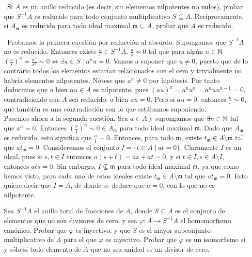 \documentclass[twoside]{article}
\begin{document}
\begin{ejercicio}{6}\
Si $A$ es un anillo reducido (es decir, sin elementos nilpotentes no
nulos), probar que $S^{-1}A$ es reducido para todo conjunto multiplicativo $S \subseteq A$.
Recíprocamente, si $A_\mathfrak{m}$ es reducido para todo ideal maximal $\mathfrak{m} \subseteq A$, probar que
$A$ es reducido.
\end{ejercicio}
\begin{solucion}\
Probamos la primera cuestión por reducción al absurdo. Supongamos que $S^{-1}A$ no es reducido. Entonces existe $\frac{a}{s}\in S^{-1}A$, $\frac{a}{s}\not\sim 0$ tal que para algún $n\in\mathbb{N}$ $\left(\frac{a}{s}\right)^n=\frac{a^n}{s^n}\sim 0\Leftrightarrow \exists u\in S\mid a^nu=0$. Vamos a suponer que $u\neq 0$, puesto que de lo contrario todos los elementos estarían relacionados con el cero y trivialmente no habría elementos nilpotentes.  Nótese que $a^n\neq 0$ por hipótesis. Por tanto deducimos que o bien $au\in A$ es nilpotente, pues $(au)^n=a^nu^n=a^n u u^{n-1}=0$, contradiciendo que $A$ sea reducido; o bien $au=0$. Pero si $au=0$, entonces $\frac{a}{s}\sim 0$, que también es una contradicción con lo que estábamos suponiendo.\\

Pasemos ahora a la segunda cuestión. Sea $a\in A$ y supongamos que $\exists n\in\mathbb{N}$ tal que $a^n=0$. Entonces $\left(\frac{a}{1}\right)^n\sim 0\in A_\mathfrak{m}$ para todo ideal maximal $\mathfrak{m}$. Dado que $A_\mathfrak{m}$ es reducido, esto significa que $\frac{a}{1}\sim 0$. Entonces, para todo $\mathfrak{m}$, existe $t_\mathfrak{m}\in A\setminus\mathfrak{m}$ tal que $at_\mathfrak{m}=0$. Consideremos el conjunto $I=\{t\in A\mid at=0\}$. Claramente $I$ es un ideal, pues si $s,t\in I$ entonces $a(s+t)=as+at=0$, y si $t\in I,s\in A\setminus I$, entonces $ats=0$. Sin embargo, $I\not\subseteq \mathfrak{m}$ para todo ideal maximal $\mathfrak{m}$, ya que como hemos visto, para cada uno de estos ideales existe $t_\mathfrak{m}\in A\setminus\mathfrak{m}$ tal que $at_\mathfrak{m}=0$. Esto quiere decir que $I=A$, de donde se deduce que $a=0$, con lo que no es nilpotente. 

\end{solucion}

\newpage

\begin{ejercicio}{8}
Sea $S^{-1}A$ el anillo total de fracciones de $A$, donde $S \subseteq A$ es el conjunto de elementos que no son divisores de cero, y sea $φ : A \to S^{-1}A$ el homomorfismo canónico. Probar que $φ$ es inyectivo, y que $S$ es el mayor subconjunto multiplicativo de $A$ para el que $φ$ es inyectivo. Probar que $φ$ es un isomorfismo si y sólo si todo elemento de $A$ que no sea unidad es un divisor de cero.
\end{ejercicio}
\end{document}
